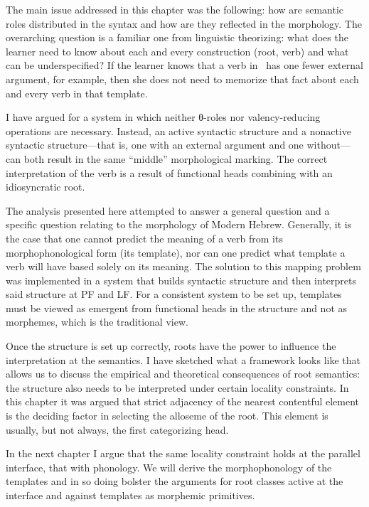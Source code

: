 The main issue addressed in this chapter was the following: how are semantic roles distributed in the syntax and how are they reflected in the morphology. The overarching question is a familiar one from linguistic theorizing: what does the learner need to know about each and every construction (root, verb) and what can be underspecified? If the learner knows that a verb in \tnif~has one fewer external argument, for example, then she does not need to memorize that fact about each and every verb in that template.  

I have argued for a system in which neither θ-roles nor valency-reducing operations are necessary. Instead, an active syntactic structure and a nonactive syntactic structure---that is, one with an external argument and one without---can both result in the same ``middle'' morphological marking. The correct interpretation of the verb is a result of functional heads combining with an idiosyncratic root.

The analysis presented here attempted to answer a general question and a specific question relating to the morphology of Modern Hebrew. Generally, it is the case that one cannot predict the meaning of a verb from its morphophonological form (its template), nor can one predict what template a verb will have based solely on its meaning. The solution to this mapping problem was implemented in a system that builds syntactic structure and then interprets said structure at PF and LF. For a consistent system to be set up, templates must be viewed as emergent from functional heads in the structure and not as morphemes, which is the traditional view.

Once the structure is set up correctly, roots have the power to influence the interpretation at the semantics. I have sketched what a framework looks like that allows us to discuss the empirical and theoretical consequences of root semantics: the structure also needs to be interpreted under certain locality constraints. In this chapter it was argued that strict adjacency of the nearest contentful element is the deciding factor in selecting the alloseme of the root. This element is usually, but not always, the first categorizing head.

In the next chapter I argue that the same locality constraint holds at the parallel interface, that with phonology. We will derive the morphophonology of the templates and in so doing bolster the arguments for root classes active at the interface and against templates as morphemic primitives.



